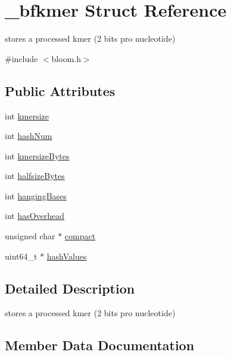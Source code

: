 \hypertarget{struct__bfkmer}{}\section{\+\_\+bfkmer Struct Reference}
\label{struct__bfkmer}


stores a processed kmer (2 bits pro nucleotide)  




{\ttfamily \#include $<$bloom.\+h$>$}

\subsection*{Public Attributes}
\begin{DoxyCompactItemize}
\item 
int \mbox{\hyperlink{struct__bfkmer_aec3b3cd33fdfbd71f38b7c9a21a00574}{kmersize}}
\item 
int \mbox{\hyperlink{struct__bfkmer_a5694e46bd18449baa91d25178d1634bf}{hash\+Num}}
\item 
int \mbox{\hyperlink{struct__bfkmer_aad605c14068200c97520fcd6e49f3e7c}{kmersize\+Bytes}}
\item 
int \mbox{\hyperlink{struct__bfkmer_a8bb57e85f90ed06b9de391be9eeba3e8}{halfsize\+Bytes}}
\item 
int \mbox{\hyperlink{struct__bfkmer_a151a92f8ca72f2d778f9ad26e96b35ae}{hanging\+Bases}}
\item 
int \mbox{\hyperlink{struct__bfkmer_a78787413a5bdf782f32ff66a8f21be20}{has\+Overhead}}
\item 
unsigned char $\ast$ \mbox{\hyperlink{struct__bfkmer_a42dcd2ff2a59169fb66f89fd0aa892a9}{compact}}
\item 
uint64\+\_\+t $\ast$ \mbox{\hyperlink{struct__bfkmer_afa4bc228a6d89c923dbda0357071187a}{hash\+Values}}
\end{DoxyCompactItemize}


\subsection{Detailed Description}
stores a processed kmer (2 bits pro nucleotide) 

\subsection{Member Data Documentation}
\mbox{\label{struct__bfkmer_a42dcd2ff2a59169fb66f89fd0aa892a9}} 
